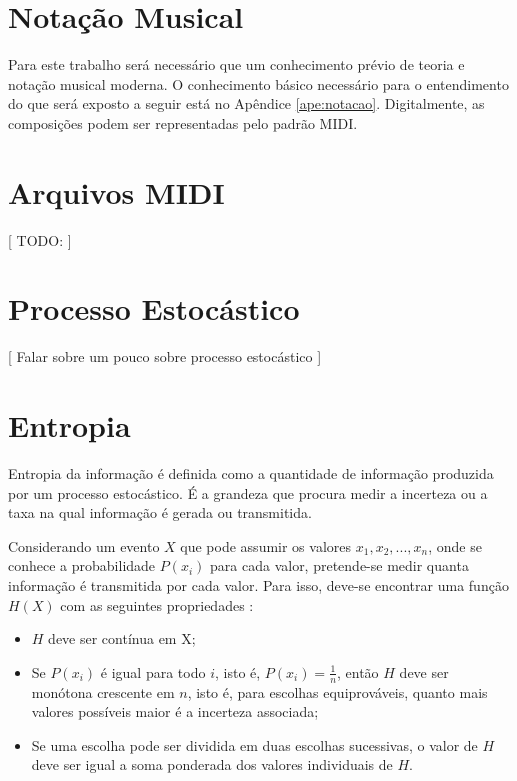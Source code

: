 \label{cap:metodo}
\section{Notação Musical}

Para este trabalho será necessário que um conhecimento prévio de teoria e notação musical moderna. O conhecimento básico necessário para o entendimento do que será exposto a seguir está no Apêndice \ref{ape:notacao}.
Digitalmente, as composições podem ser representadas pelo padrão MIDI.

\section{Arquivos MIDI}

[ TODO: ]



\section{Processo Estocástico}
[ Falar sobre um pouco sobre processo estocástico ]


\section{Entropia}


Entropia da informação é definida como a quantidade de informação produzida por um processo estocástico. É a grandeza que procura medir a incerteza ou a taxa na qual informação é gerada ou transmitida.

Considerando um evento $X$ que pode assumir os valores ${x_1, x_2, ..., x_n}$, onde se conhece a probabilidade $P(x_i)$ para cada valor, pretende-se medir quanta informação é transmitida por cada valor. Para isso, deve-se encontrar uma função $H(X)$ com as seguintes propriedades \cite{shannon}:

\begin{itemize}
    \item $H$ deve ser contínua em X;
    \item Se $P(x_i)$ é igual para todo $i$, isto é, $P(x_i) = \frac{1}{n}$, então $H$ deve ser monótona crescente em $n$, isto é, para escolhas equiprováveis, quanto mais valores possíveis maior é a incerteza associada;
    \item Se uma escolha pode ser dividida em duas escolhas sucessivas, o valor de $H$ deve ser igual a soma ponderada dos valores individuais de $H$. 
\end{itemize}

